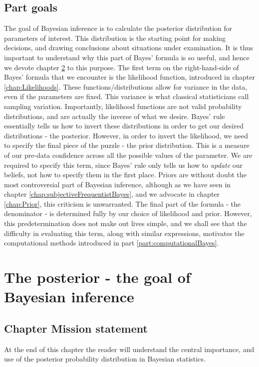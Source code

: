 \documentclass[11pt,fullpage]{book}
\begin{document}
\section{Part goals}
The goal of Bayesian inference is to calculate the posterior distribution for parameters of interest. This distribution is the starting point for making decisions, and drawing conclusions about situations under examination. It is thus important to understand why this part of Bayes' formula is so useful, and hence we devote chapter \ref{chap:posterior} to this purpose. The first term on the right-hand-side of Bayes' formula that we encounter is the likelihood function, introduced in chapter \ref{chap:Likelihoods}. These functions/distributions allow for variance in the data, even if the parameters are fixed. This variance is what classical statisticians call sampling variation. Importantly, likelihood functions are not valid probability distributions, and are actually the inverse of what we desire. Bayes' rule essentially tells us how to invert these distributions in order to get our desired distributions - the posterior. However, in order to invert the likelihood, we need to specify the final piece of the puzzle - the prior distribution. This is a measure of our pre-data confidence across all the possible values of the parameter. We are required to specify this term, since Bayes' rule only tells us how to \textit{update} our beliefs, not how to specify them in the first place. Priors are without doubt the most controversial part of Bayesian inference, although as we have seen in chapter \ref{chap:subjectiveFrequentistBayes}, and we advocate in chapter \ref{chap:Prior}, this criticism is unwarranted. The final part of the formula - the denominator - is determined fully by our choice of likelihood and prior. However, this predetermination does not make out lives simple, and we shall see that the difficulty in evaluating this term, along with similar expressions, motivates the computational methods introduced in part \ref{part:computationalBayes}.

\chapter{The posterior - the goal of Bayesian inference}\label{chap:posterior}
\section{Chapter Mission statement}
At the end of this chapter the reader will understand the central importance, and use of the posterior probability distribution in Bayesian statistics.
\end{document}
